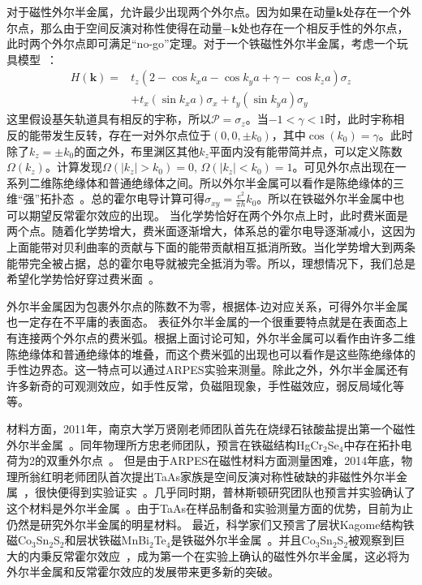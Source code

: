 对于磁性外尔半金属，允许最少出现两个外尔点。因为如果在动量$\mathbf{k}$处存在一个外尔点，那么由于空间反演对称性使得在动量$-\mathbf{k}$处也存在一个相反手性的外尔点，此时两个外尔点即可满足“no-go”定理。对于一个铁磁性外尔半金属，考虑一个玩具模型~\citep{Armitage2018}：
\begin{equation}
    \label{eq:1-8}
    \begin{aligned}
    H(\mathbf{k})=& t_{z}\left(2-\cos k_{x} a-\cos k_{y} a+\gamma-\cos k_{z} a\right) \sigma_{z}\\
    &+t_{x}\left(\sin k_{x} a\right) \sigma_{x}+t_{y}\left(\sin k_{y} a\right) \sigma_{y}
    \end{aligned}
\end{equation}
这里假设基矢轨道具有相反的宇称，所以$\mathcal{P}=\sigma_{z}$。当$-1<\gamma<1$时，此时宇称相反的能带发生反转，存在一对外尔点位于$(0,0,\pm k_0)$，其中$\cos(k_0)=\gamma$。此时除了$k_z=\pm k_0$的面之外，布里渊区其他$k_z$平面内没有能带简并点，可以定义陈数$\Omega(k_z)$。计算发现$\Omega(|k_z|> k_0)=0$, $\Omega(|k_z|< k_0)=1$。可见外尔点出现在一系列二维陈绝缘体和普通绝缘体之间。所以外尔半金属可以看作是陈绝缘体的三维“强”拓扑态~\citep{weng2015quantum}。总的霍尔电导计算可得$\sigma_{xy}=\frac{e^2}{\pi h} k_0$。所以在铁磁外尔半金属中也可以期望反常霍尔效应的出现。
当化学势恰好在两个外尔点上时，此时费米面是两个点。随着化学势增大，费米面逐渐增大，体系总的霍尔电导逐渐减小，这因为上面能带对贝利曲率的贡献与下面的能带贡献相互抵消所致。当化学势增大到两条能带完全被占据，总的霍尔电导就被完全抵消为零。所以，理想情况下，我们总是希望化学势恰好穿过费米面~\citep{weng2015quantum,Armitage2018}。

外尔半金属因为包裹外尔点的陈数不为零，根据体-边对应关系，可得外尔半金属也一定存在不平庸的表面态。
表征外尔半金属的一个很重要特点就是在表面态上有连接两个外尔点的费米弧。根据上面讨论可知，外尔半金属可以看作由许多二维陈绝缘体和普通绝缘体的堆叠，而这个费米弧的出现也可以看作是这些陈绝缘体的手性边界态。这一特点可以通过ARPES实验来测量。除此之外，外尔半金属还有许多新奇的可观测效应，如手性反常，负磁阻现象，手性磁效应，弱反局域化等等。

材料方面，2011年，南京大学万贤刚老师团队首先在烧绿石铱酸盐提出第一个磁性外尔半金属~\citep{Wan2011}。同年物理所方忠老师团队，预言在铁磁结构HgCr$_2$Se$_4$中存在拓扑电荷为2的双重外尔点~\citep{xu2011chern}。
但是由于ARPES在磁性材料方面测量困难，2014年底，物理所翁红明老师团队首次提出TaAs家族是空间反演对称性破缺的非磁性外尔半金属~\citep{weng2015weyl}，很快便得到实验证实~\citep{lv2015experimental,lv2015observation,lv2015observation2}。几乎同时期，普林斯顿研究团队也预言并实验确认了这个材料是外尔半金属~\citep{huang2015weyl,xu2015discovery,xuSY2015}。由于TaAs在样品制备和实验测量方面的优势，目前为止仍然是研究外尔半金属的明星材料。 最近，科学家们又预言了层状Kagome结构铁磁Co$_3$Sn$_2$S$_2$和层状铁磁MnBi$_2$Te$_4$是铁磁外尔半金属~\citep{cosns2018,xucosns,zhanghj2019,Li2019}。并且Co$_3$Sn$_2$S$_2$被观察到巨大的内秉反常霍尔效应~\citep{cosns2018,2017Giant}，成为第一个在实验上确认的磁性外尔半金属，这必将为外尔半金属和反常霍尔效应的发展带来更多新的突破。


